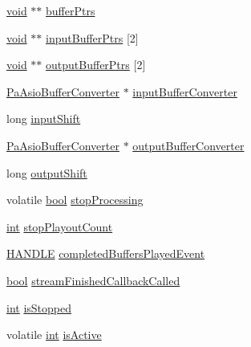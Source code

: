 \begin{DoxyCompactItemize}
\item 
\hyperlink{sound_8c_ae35f5844602719cf66324f4de2a658b3}{void} $\ast$$\ast$ \hyperlink{struct_pa_asio_stream_ac907e7cf08200d9ebeed13c17cb5c6e2}{buffer\+Ptrs}
\item 
\hyperlink{sound_8c_ae35f5844602719cf66324f4de2a658b3}{void} $\ast$$\ast$ \hyperlink{struct_pa_asio_stream_af25193d33adf5418364e04c10d6e8b86}{input\+Buffer\+Ptrs} \mbox{[}2\mbox{]}
\item 
\hyperlink{sound_8c_ae35f5844602719cf66324f4de2a658b3}{void} $\ast$$\ast$ \hyperlink{struct_pa_asio_stream_a96357cfec93b4ff57750eb15467dc36a}{output\+Buffer\+Ptrs} \mbox{[}2\mbox{]}
\item 
\hyperlink{pa__asio_8cpp_aa79f309d7deff671e242cca72615652a}{Pa\+Asio\+Buffer\+Converter} $\ast$ \hyperlink{struct_pa_asio_stream_a0cba4fd052886fae39f3a7e45ec35034}{input\+Buffer\+Converter}
\item 
long \hyperlink{struct_pa_asio_stream_a26c73578d78f8581d21ad2b3c45e642f}{input\+Shift}
\item 
\hyperlink{pa__asio_8cpp_aa79f309d7deff671e242cca72615652a}{Pa\+Asio\+Buffer\+Converter} $\ast$ \hyperlink{struct_pa_asio_stream_a554712919295460d9e88a03c32c8fb9a}{output\+Buffer\+Converter}
\item 
long \hyperlink{struct_pa_asio_stream_a996681ee962b66ef8c5b316f529fe6a6}{output\+Shift}
\item 
volatile \hyperlink{mac_2config_2i386_2lib-src_2libsoxr_2soxr-config_8h_abb452686968e48b67397da5f97445f5b}{bool} \hyperlink{struct_pa_asio_stream_a138a1dc47e2ad061591f9d8dc7d07926}{stop\+Processing}
\item 
\hyperlink{xmltok_8h_a5a0d4a5641ce434f1d23533f2b2e6653}{int} \hyperlink{struct_pa_asio_stream_a64c1de9b0213087469905a2934227bd4}{stop\+Playout\+Count}
\item 
\hyperlink{_sound_touch_d_l_l_8h_aa8c0374618b33785ccb02f74bcfebc46}{H\+A\+N\+D\+LE} \hyperlink{struct_pa_asio_stream_acecaa140151e2d54cc9a904ec8d67244}{completed\+Buffers\+Played\+Event}
\item 
\hyperlink{mac_2config_2i386_2lib-src_2libsoxr_2soxr-config_8h_abb452686968e48b67397da5f97445f5b}{bool} \hyperlink{struct_pa_asio_stream_ad53dcc5be9046ad25a61359aa3010796}{stream\+Finished\+Callback\+Called}
\item 
\hyperlink{xmltok_8h_a5a0d4a5641ce434f1d23533f2b2e6653}{int} \hyperlink{struct_pa_asio_stream_a32266ca70b73b4bad7c7605ff6308ac7}{is\+Stopped}
\item 
volatile \hyperlink{xmltok_8h_a5a0d4a5641ce434f1d23533f2b2e6653}{int} \hyperlink{struct_pa_asio_stream_a58968563c91f34801e82f695ca1ad7bc}{is\+Active}
$$
\end{DoxyCompactItemize}
